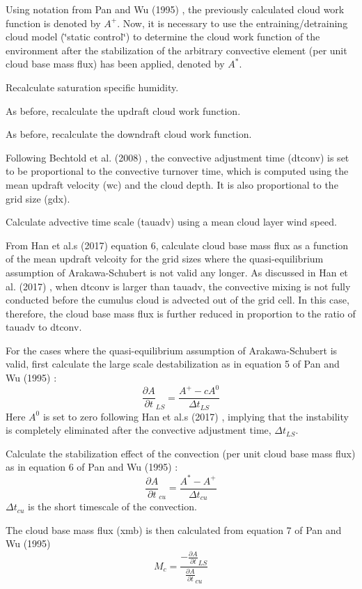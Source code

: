\begin{DoxyItemize}
\item Using notation from Pan and Wu (1995) \cite{pan_and_wu_1995}, the previously calculated cloud work function is denoted by $A^+$. Now, it is necessary to use the entraining/detraining cloud model (\char`\"{}static control\char`\"{}) to determine the cloud work function of the environment after the stabilization of the arbitrary convective element (per unit cloud base mass flux) has been applied, denoted by $A^*$.
\item Recalculate saturation specific humidity.
\item As before, recalculate the updraft cloud work function.
\item As before, recalculate the downdraft cloud work function.
\item Following Bechtold et al. (2008) \cite{bechtold_et_al_2008}, the convective adjustment time (dtconv) is set to be proportional to the convective turnover time, which is computed using the mean updraft velocity (wc) and the cloud depth. It is also proportional to the grid size (gdx).
\item Calculate advective time scale (tauadv) using a mean cloud layer wind speed.
\item From Han et al.\textquotesingle{}s (2017) \cite{han_et_al_2017} equation 6, calculate cloud base mass flux as a function of the mean updraft velcoity for the grid sizes where the quasi-\/equilibrium assumption of Arakawa-\/\+Schubert is not valid any longer. As discussed in Han et al. (2017) \cite{han_et_al_2017} , when dtconv is larger than tauadv, the convective mixing is not fully conducted before the cumulus cloud is advected out of the grid cell. In this case, therefore, the cloud base mass flux is further reduced in proportion to the ratio of tauadv to dtconv.
\item For the cases where the quasi-\/equilibrium assumption of Arakawa-\/\+Schubert is valid, first calculate the large scale destabilization as in equation 5 of Pan and Wu (1995) \cite{pan_and_wu_1995} \+: \[ \frac{\partial A}{\partial t}_{LS}=\frac{A^+-cA^0}{\Delta t_{LS}} \] Here $A^0$ is set to zero following Han et al.\textquotesingle{}s (2017) \cite{han_et_al_2017} , implying that the instability is completely eliminated after the convective adjustment time, $\Delta t_{LS}$.
\item Calculate the stabilization effect of the convection (per unit cloud base mass flux) as in equation 6 of Pan and Wu (1995) \cite{pan_and_wu_1995} \+: \[ \frac{\partial A}{\partial t}_{cu}=\frac{A^*-A^+}{\Delta t_{cu}} \] $\Delta t_{cu}$ is the short timescale of the convection.
\item The cloud base mass flux (xmb) is then calculated from equation 7 of Pan and Wu (1995) \cite{pan_and_wu_1995} \[ M_c=\frac{-\frac{\partial A}{\partial t}_{LS}}{\frac{\partial A}{\partial t}_{cu}} \]


\end{DoxyItemize}
